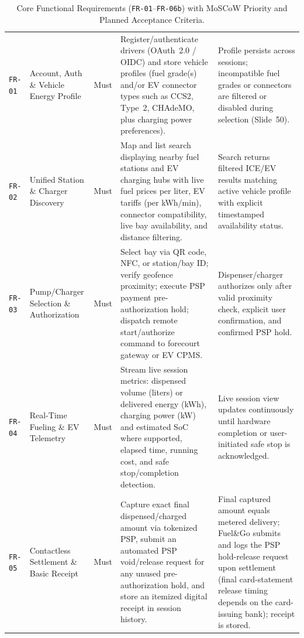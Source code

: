 \begin{table}[htbp]
  \centering
  \caption{Core Functional Requirements (\texttt{FR-01}--\texttt{FR-06b}) with MoSCoW Priority and Planned Acceptance Criteria.}
  \label{tab:fr-matrix}
  \small
  \begin{tabularx}{\linewidth}{@{}P{15mm} P{28mm} P{14mm} L P{35mm}@{}}
    \toprule
     &  &  &  &  \\
    \midrule
    \texttt{FR-01} & Account, Auth \& Vehicle Energy Profile & Must & Register/authenticate drivers (OAuth~2.0 / OIDC) and store vehicle profiles (fuel grade(s) and/or EV connector types such as CCS2, Type~2, CHAdeMO, plus charging power preferences). & Profile persists across sessions; incompatible fuel grades or connectors are filtered or disabled during selection (Slide~50). \\
    \texttt{FR-02} & Unified Station \& Charger Discovery & Must & Map and list search displaying nearby fuel stations and EV charging hubs with live fuel prices per liter, EV tariffs (per kWh/min), connector compatibility, live bay availability, and distance filtering. & Search returns filtered ICE/EV results matching active vehicle profile with explicit timestamped availability status. \\
    \texttt{FR-03} & Pump/Charger Selection \& Authorization & Must & Select bay via QR code, NFC, or station/bay ID; verify geofence proximity; execute PSP payment pre-authorization hold; dispatch remote start/authorize command to forecourt gateway or EV CPMS. & Dispenser/charger authorizes only after valid proximity check, explicit user confirmation, and confirmed PSP hold. \\
    \texttt{FR-04} & Real-Time Fueling \& EV Telemetry & Must & Stream live session metrics: dispensed volume (liters) or delivered energy (kWh), charging power (kW) and estimated SoC where supported, elapsed time, running cost, and safe stop/completion detection. & Live session view updates continuously until hardware completion or user-initiated safe stop is acknowledged. \\
    \texttt{FR-05} & Contactless Settlement \& Basic Receipt & Must & Capture exact final dispensed/charged amount via tokenized PSP, submit an automated PSP void/release request for any unused pre-authorization hold, and store an itemized digital receipt in session history. & Final captured amount equals metered delivery; Fuel\&Go submits and logs the PSP hold-release request upon settlement (final card-statement release timing depends on the card-issuing bank); receipt is stored. \\

\end{tabularx}
\end{table}

